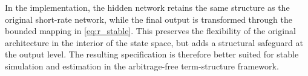 In the implementation, the hidden network retains the same structure as the original
short-rate network, while the final output is transformed through the bounded mapping in
\eqref{eq:r_stable}. This preserves the flexibility of the original architecture in the
interior of the state space, but adds a structural safeguard at the output level. The
resulting specification is therefore better suited for stable simulation and estimation in
the arbitrage-free term-structure framework.